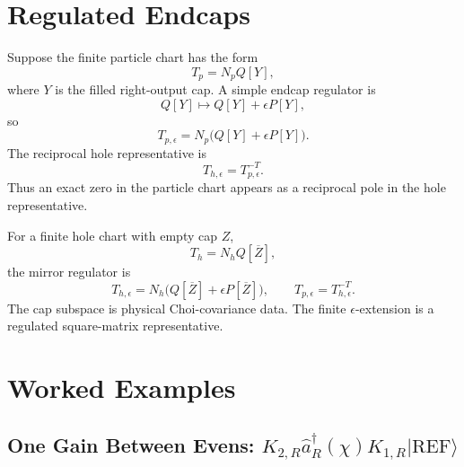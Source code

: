 \documentclass[aps,prb,onecolumn,nofootinbib,superscriptaddress]{revtex4-2}
\newcommand{\REF}{\mathrm{REF}}
\newcommand{\ket}[1]{\lvert #1\rangle}
\newcommand{\ahat}{\hat a}
\newcommand{\eps}{\epsilon}
\begin{document}
\section{Regulated Endcaps}

Suppose the finite particle chart has the form
\begin{equation}
  T_p=N_pQ[Y],
\end{equation}
where \(Y\) is the filled right-output cap.  A simple endcap regulator is
\begin{equation}
  Q[Y]\longmapsto Q[Y]+\eps P[Y],
\end{equation}
so
\begin{equation}
  T_{p,\eps}=N_p\bigl(Q[Y]+\eps P[Y]\bigr).
  \label{eq:particle-regulator}
\end{equation}
The reciprocal hole representative is
\begin{equation}
  T_{h,\eps}=T_{p,\eps}^{-T}.
  \label{eq:hole-reciprocal}
\end{equation}
Thus an exact zero in the particle chart appears as a reciprocal pole in the
hole representative.

For a finite hole chart with empty cap \(Z\),
\begin{equation}
  T_h=N_hQ[\overline Z],
\end{equation}
the mirror regulator is
\begin{equation}
  T_{h,\eps}=N_h\bigl(Q[\overline Z]+\eps P[\overline Z]\bigr),
  \qquad
  T_{p,\eps}=T_{h,\eps}^{-T}.
  \label{eq:hole-regulator}
\end{equation}
The cap subspace is physical Choi-covariance data.  The finite
\(\eps\)-extension is a regulated square-matrix representative.

\section{Worked Examples}

\subsection{\texorpdfstring{One Gain Between Evens: \(K_{2,R}\ahat_R^\dagger(\chi)K_{1,R}\ket{\REF}\)}{One Gain Between Evens}}
\end{document}
